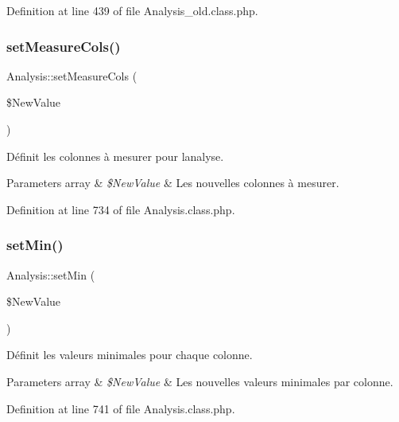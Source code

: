 Definition at line 439 of file Analysis\+\_\+old.\+class.\+php.

\mbox{\label{class_analysis_ab4f8d5dc30e551e9687dc5021b824f45}} 
\subsubsection{\texorpdfstring{set\+Measure\+Cols()}{setMeasureCols()}\hspace{0.1cm}{\footnotesize\ttfamily [2/2]}}
{\footnotesize\ttfamily Analysis\+::set\+Measure\+Cols (\begin{DoxyParamCaption}\item[{}]{\$\+New\+Value }\end{DoxyParamCaption})}

Définit les colonnes à mesurer pour l\textquotesingle{}analyse.


\begin{DoxyParams}[1]{Parameters}
array & {\em \$\+New\+Value} & Les nouvelles colonnes à mesurer. \\
\hline
\end{DoxyParams}


Definition at line 734 of file Analysis.\+class.\+php.

\mbox{\label{class_analysis_a06b88090a4e8a9d54f9e021caa5e74e1}} 
\subsubsection{\texorpdfstring{set\+Min()}{setMin()}}
{\footnotesize\ttfamily Analysis\+::set\+Min (\begin{DoxyParamCaption}\item[{}]{\$\+New\+Value }\end{DoxyParamCaption})}

Définit les valeurs minimales pour chaque colonne.


\begin{DoxyParams}[1]{Parameters}
array & {\em \$\+New\+Value} & Les nouvelles valeurs minimales par colonne. \\
\hline
\end{DoxyParams}


Definition at line 741 of file Analysis.\+class.\+php.


